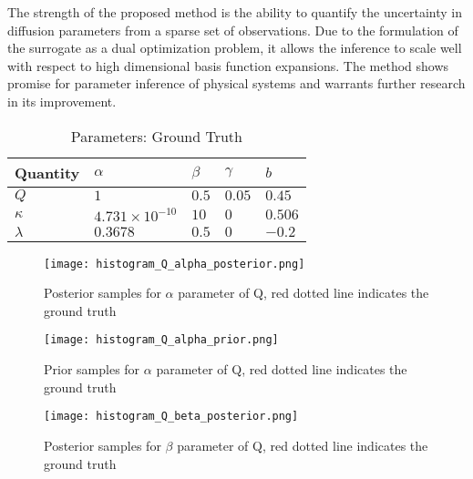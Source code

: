 The strength of the proposed method is the ability to quantify the uncertainty in diffusion parameters from a sparse set of observations. Due to the formulation of the surrogate as a dual optimization problem, it allows the inference to scale well with respect to high dimensional basis function expansions. The method shows promise for parameter inference of physical systems and warrants further research in its improvement.


\begin{table}[t]
  \caption{Parameters: Ground Truth}
  \label{tab:ground-truth}
  \centering
  \begin{tabular}{lllll}
    \toprule
    \cmidrule{1-2}
    Quantity     & $\alpha$     & $\beta$ & $\gamma$ & $b$ \\
    \midrule
    $Q$ & $1$  & $0.5$ & $0.05$  & $0.45$     \\
    $\kappa$  & $4.731 \times 10^{-10}$ & $10$  & $0$ & $0.506$ \\
    $\lambda$ & $0.3678$ & $0.5$  & $0$ & $-0.2$ \\
    \bottomrule
  \end{tabular}
\end{table}

\begin{figure}[h]
\vspace{.3in}
\centerline{\texttt{[image: histogram\_Q\_alpha\_posterior.png]}}
\vspace{.3in}
\caption{Posterior samples for $\alpha$ parameter of Q, red dotted line indicates the ground truth}
\label{fig:alpha}
\end{figure}

\begin{figure}[h]
\vspace{.3in}
\centerline{\texttt{[image: histogram\_Q\_alpha\_prior.png]}}
\vspace{.3in}
\caption{Prior samples for $\alpha$ parameter of Q, red dotted line indicates the ground truth}
\label{fig:alphaprior}
\end{figure}

\begin{figure}[h]
\vspace{.3in}
\centerline{\texttt{[image: histogram\_Q\_beta\_posterior.png]}}
\vspace{.3in}
\caption{Posterior samples for $\beta$ parameter of Q, red dotted line indicates the ground truth}
\label{fig:beta}
\end{figure}

